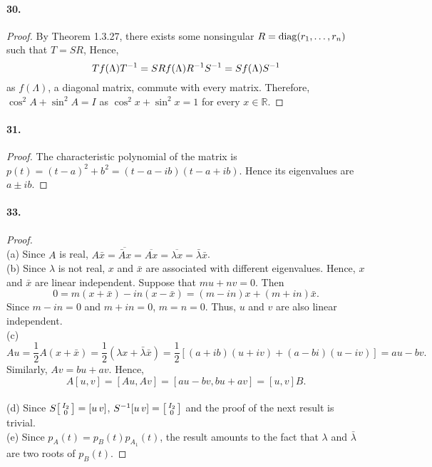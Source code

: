   \paragraph{30.}
  \begin{proof}
    By Theorem 1.3.27, there exists some nonsingular $R=\operatorname{diag}(r_1,\dots,r_n)$
    such that $T=SR$, Hence,
    \[
      Tf(\Lambda)T^{-1} = SRf(\Lambda)R^{-1} S^{-1} = Sf(\Lambda)S^{-1}
    \]
    as $f(\Lambda)$, a diagonal matrix, commute with every matrix. Therefore,
    $\cos^2A+\sin^2A=I$ as $\cos^2x+\sin^2x=1$ for every $x\in\mathbb{R}$.
  \end{proof}

  \paragraph{31.}
  \begin{proof}
    The characteristic polynomial of the matrix is $p(t)=(t-a)^2+b^2=
    (t-a-ib)(t-a+ib)$. Hence its eigenvalues are $a\pm ib$.
  \end{proof}

  \paragraph{33.}
  \begin{proof}
    $\,$\\
    (a) Since $A$ is real, $A\bar{x} = \overline{\bar{A}x} = \overline{Ax} = 
    \overline{\lambda x} = \bar{\lambda}\bar{x}$.\\
    (b) Since $\lambda$ is not real, $x$ and $\bar{x}$ are associated with
    different eigenvalues. Hence, $x$ and $\bar{x}$ are linear independent.
    Suppose that $mu+nv=0$. Then
    \[
      0= m(x+\bar{x})-in(x-\bar{x}) = (m-in)x + (m+in)\bar{x}.
    \]
    Since $m-in=0$ and $m+in=0$, $m=n=0$. Thus, $u$ and $v$ are also linear 
    independent.\\
    (c) 
    \[
      Au = \frac{1}{2}A(x+\bar{x})=\frac{1}{2}(\lambda x+\bar{\lambda}\bar{x})
      = \frac{1}{2}[(a+ib)(u+iv)+(a-bi)(u-iv)] = au-bv.
    \]
    Similarly, $Av=bu+av$. Hence,
    \[
      A[u, v] = [Au, Av] = [au-bv, bu+av] = [u, v]B.
    \]\\
    (d) Since $S\begin{bsmallmatrix} I_2 \\ 0 \end{bsmallmatrix} = [u\,v]$, 
    $S^{-1}[u\,v]=\begin{bsmallmatrix} I_2 \\ 0 \end{bsmallmatrix}$ and the proof
    of the next result is trivial. \\
    (e) Since $p_A(t) = p_B(t)p_{A_1}(t)$, the result amounts to the fact that
    $\lambda$ and $\bar{\lambda}$ are two roots of $p_B(t)$.
  \end{proof}
  

